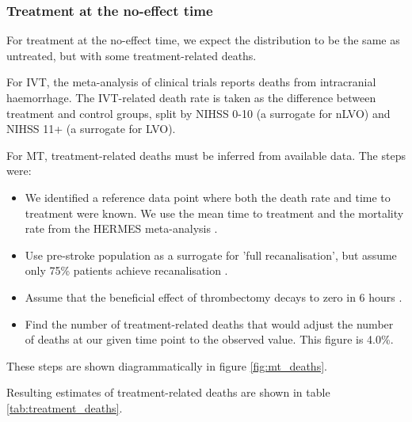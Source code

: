\subsubsection{Treatment at the no-effect time}

For treatment at the no-effect time, we expect the distribution to be the same as untreated, but with some treatment-related deaths.

For IVT, the meta-analysis of clinical trials \cite{emberson_effect_2014} reports deaths from intracranial haemorrhage. The IVT-related death rate is taken as the difference between treatment and control groups, split by NIHSS 0-10 (a surrogate for nLVO) and NIHSS 11+ (a surrogate for LVO).

For MT, treatment-related deaths must be inferred from available data. The steps were:

\begin{itemize}
    \item We identified a reference data point where both the death rate and time to treatment were known. We use the mean time to treatment and the mortality rate from the HERMES meta-analysis \cite{goyal_endovascular_2016}.
    \item Use pre-stroke population as a surrogate for 'full recanalisation', but assume only 75\% patients achieve recanalisation \cite{hui_efficacy_2020}.
    \item Assume that the beneficial effect of thrombectomy decays to zero in 6 hours \cite{fransen_time_2016}.
    \item Find the number of treatment-related deaths that would adjust the number of deaths at our given time point to the observed value. This figure is 4.0\%.
\end{itemize}

These steps are shown diagrammatically in figure \ref{fig:mt_deaths}.

Resulting estimates of treatment-related deaths are shown in table \ref{tab:treatment_deaths}.  

